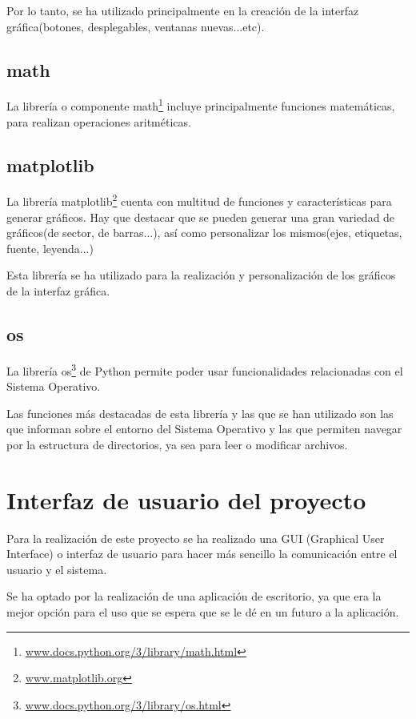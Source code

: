 Por lo tanto, se ha utilizado principalmente en la creación de la interfaz gráfica(botones, desplegables, ventanas nuevas...etc).


\subsection{math}
La librería o componente math\footnote{\href{https://docs.python.org/3/library/math.html}{www.docs.python.org/3/library/math.html}} incluye principalmente funciones matemáticas, para realizan operaciones aritméticas. 


\subsection{matplotlib}
La librería matplotlib\footnote{\href{https://matplotlib.org/}{www.matplotlib.org}} cuenta con multitud de funciones y características para generar gráficos. Hay que destacar que se pueden generar una gran variedad de gráficos(de sector, de barras...), así como personalizar los mismos(ejes, etiquetas, fuente, leyenda...)

Esta librería se ha utilizado para la realización y personalización de los gráficos de la interfaz gráfica.


\subsection{os}
La librería os\footnote{\href{https://docs.python.org/3/library/os.html}{www.docs.python.org/3/library/os.html}} de Python permite poder usar funcionalidades relacionadas con el Sistema Operativo. 

Las funciones más destacadas de esta librería y las que se han utilizado son las que informan sobre el entorno del Sistema Operativo y las que permiten navegar por la estructura de directorios, ya sea para leer o modificar archivos.


\section{Interfaz de usuario del proyecto}\label{interfaz_de_usuario_del_proyecto}
Para la realización de este proyecto se ha realizado una GUI (Graphical User Interface) o interfaz de usuario para hacer más sencillo la comunicación entre el usuario y el sistema.

Se ha optado por la realización de una aplicación de escritorio, ya que era la mejor opción para el uso que se espera que se le dé en un futuro a la aplicación.




